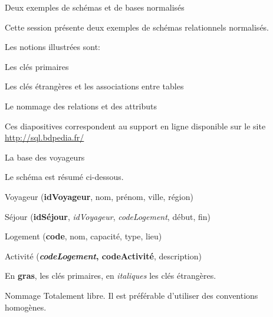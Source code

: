 
\begin{frame}[fragile]{Deux exemples de schémas et de bases normalisés}

Cette session présente deux exemples de schémas relationnels normalisés. 

\vfill

Les notions
illustrées sont:

\begin{redbullet}
  \item Les clés primaires
  \item Les clés étrangères et les associations entre tables
  \item Le nommage des relations et des attributs
\end{redbullet}

\vfill
\begin{blocgauche}
\alert{Ces diapositives correspondent au support en ligne disponible sur
le site \url{http://sql.bdpedia.fr/}}
\end{blocgauche}

\end{frame}


\begin{frame}{La base des voyageurs}

Le schéma est résumé ci-dessous. 
\vfill

\begin{redbullet}
  \item Voyageur (\textbf{idVoyageur}, nom, prénom, ville, région)
    \item  Séjour (\textbf{idSéjour}, \textit{idVoyageur}, \textit{codeLogement}, début, fin)
    \item Logement (\textbf{code}, nom, capacité, type, lieu)
    \item Activité (\textbf{\textit{codeLogement}, codeActivité}, description)
\end{redbullet}

\vfill

En \textbf{gras}, les clés primaires, en
\textit{italiques} les clés étrangères.

\begin{blocgauche}
\begin{remblock}{Nommage}
Totalement libre. Il est préférable d'utiliser des conventions homogènes.
\end{remblock}
\end{blocgauche}

\end{frame}

